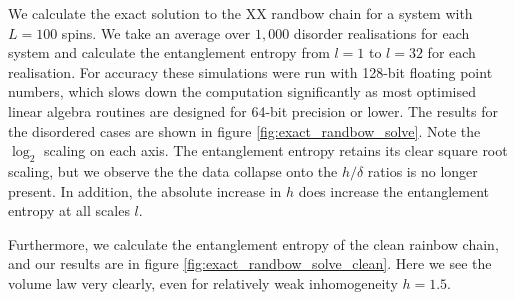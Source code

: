 We calculate the exact solution to the XX randbow chain for a system with $L = 100$ spins. We take an average over $1,000$ disorder realisations for each system and calculate the entanglement entropy from $l = 1$ to $l = 32$ for each realisation. For accuracy these simulations were run with 128-bit floating point numbers, which slows down the computation significantly as most optimised linear algebra routines are designed for 64-bit precision or lower. The results for the disordered cases are shown in figure \ref{fig:exact_randbow_solve}. Note the $\log_2$ scaling on each axis. The entanglement entropy retains its clear square root scaling, but we observe the the data collapse onto the $h / \delta$ ratios is no longer present. In addition, the absolute increase in $h$ does increase the entanglement entropy at all scales $l$. 

Furthermore, we calculate the entanglement entropy of the clean rainbow chain, and our results are in figure \ref{fig:exact_randbow_solve_clean}. Here we see the volume law very clearly, even for relatively weak inhomogeneity $h = 1.5$. 






